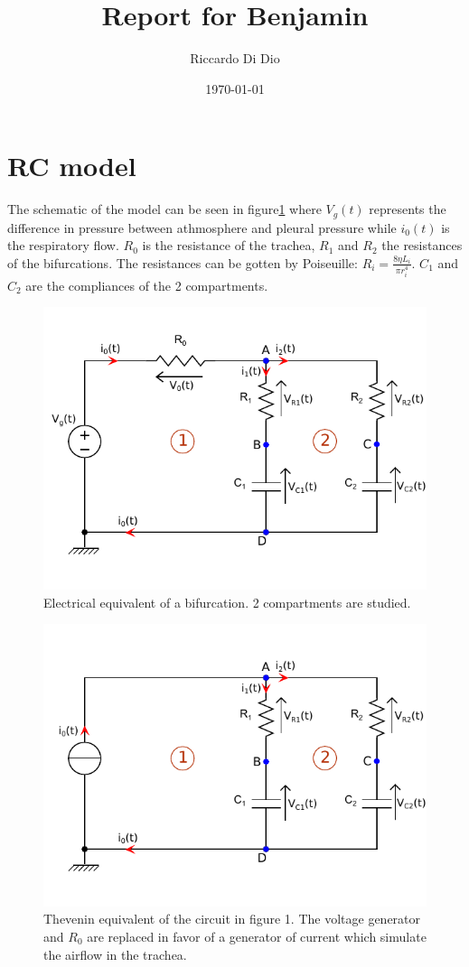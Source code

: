 \documentclass[11pt]{article}
\title{\vspace{-3.0cm}Report for Benjamin}
\author{Riccardo Di Dio}
\date{\today}
\begin{document}
\maketitle
\section{RC model}
The schematic of the model can be seen in figure\ref{fig:LungModelRC}
where $V_g(t)$ represents the difference in pressure between athmosphere and pleural pressure while $i_0(t)$ is the respiratory flow. $R_0$ is the resistance of the trachea, $R_1$ and $R_2$ the resistances of the bifurcations. The resistances can be  gotten by Poiseuille: $R_i = \frac{8\eta L_i}{\pi r_i^4}$. $C_1$ and $C_2$ are the compliances of the 2 compartments.
\begin{figure}[ht]
\label{fig:LungModelRC}
\centering
\includegraphics[scale=1.3]{LungModelRC.pdf}
\caption{Electrical equivalent of a bifurcation. 2 compartments are studied.}
\end{figure}
\begin{figure}[ht]
\includegraphics[scale=1.3]{TheveninEquivalent.pdf}
\caption{Thevenin equivalent of the circuit in figure 1. The voltage generator and $R_0$ are replaced in favor of a generator of current which simulate the airflow in the trachea.}
\end{figure}
\end{document}
